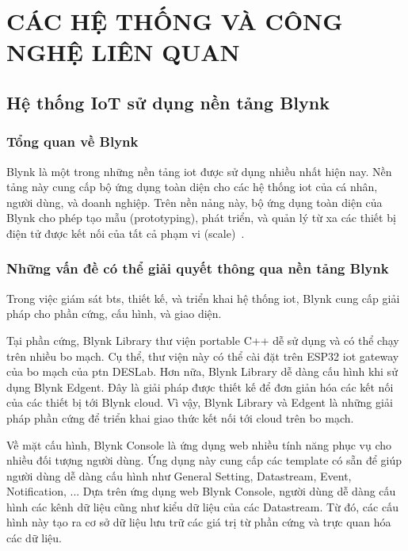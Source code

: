 \chapter{CÁC HỆ THỐNG VÀ CÔNG NGHỆ LIÊN QUAN}
\label{Chapter2}

\section{Hệ thống IoT sử dụng nền tảng Blynk}

\subsection{Tổng quan về Blynk}

Blynk là một trong những nền tảng \acrshort{iot} được sử dụng nhiều nhất hiện nay. Nền tảng này cung cấp bộ ứng dụng toàn diện cho các hệ thống \acrshort{iot} của cá nhân, người dùng, và doanh nghiệp. Trên nền nảng này, bộ ứng dụng toàn diện của Blynk cho phép tạo mẫu (prototyping), phát triển, và quản lý từ xa các thiết bị điện tử được kết nối của tất cả phạm vi (scale)~\cite{Blynk-Overview}.

\subsection{Những vấn đề có thể giải quyết thông qua nền tảng Blynk}

Trong việc giám sát \acrshort{bts}, thiết kế, và triển khai hệ thống \acrshort{iot}, Blynk cung cấp giải pháp cho phần cứng, cấu hình, và giao diện.

Tại phần cứng, Blynk Library thư viện portable C++ dễ sử dụng và có thể chạy trên nhiều bo mạch. Cụ thể, thư viện này có thể cài đặt trên ESP32 \acrshort{iot} gateway của bo mạch của \acrshort{ptn} DESLab. Hơn nữa, Blynk Library dễ dàng cấu hình khi sử dụng Blynk Edgent. Đây là giải pháp được thiết kế để đơn giản hóa các kết nối của các thiết bị tới Blynk cloud. Vì vậy, Blynk Library và Edgent là những giải pháp phần cứng để triển khai giao thức kết nối tới cloud trên bo mạch.

Về mặt cấu hình, Blynk Console là ứng dụng web nhiều tính năng phục vụ cho nhiều đối tượng người dùng. Ứng dụng này cung cấp các template có sẵn để giúp người dùng dễ dàng cấu hình như General Setting, Datastream, Event, Notification, ... Dựa trên ứng dụng web Blynk Console, người dùng dễ dàng cấu hình các kênh dữ liệu cũng như kiểu dữ liệu của các Datastream. Từ đó, các cấu hình này tạo ra cơ sở dữ liệu lưu trữ các giá trị từ phần cứng và trực quan hóa các dữ liệu.

